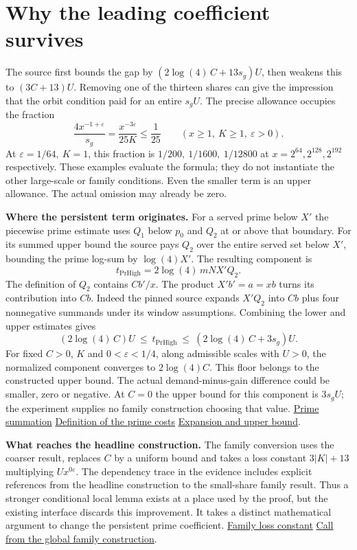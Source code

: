 \documentclass[12pt,letterpaper]{article}
\newcommand{\orig}[3]{\href{https://github.com/nousentllc/riemann-hypothesis/blob/40e56bab026552e089d7afcfeff08d2defb9c005/src/#1.lean\#L#2}{#3}}
\newcommand{\para}[1]{\par\medskip\noindent\textbf{#1}\quad}
\newcommand{\pagepart}[1]{\clearpage\section{#1}}
\newcommand{\sg}{s_g}\newcommand{\floorc}{2\log(4)\,C}
\begin{document}
\pagepart{Why the leading coefficient survives}
The source first bounds the gap by \((\floorc+13\sg)U\), then weakens this to \((3C+13)U\). Removing one of the thirteen shares can give the impression that the orbit condition paid for an entire \(\sg U\). The precise allowance occupies the fraction
\[
 \frac{4x^{-1+\varepsilon}}{\sg}
 =\frac{x^{-3\varepsilon}}{25K}\le\frac1{25}
 \qquad(x\ge1,\ K\ge1,\ \varepsilon>0).
\]
At \(\varepsilon=1/64,\ K=1\), this fraction is \(1/200,\ 1/1600,\ 1/12800\) at \(x=2^{64},2^{128},2^{192}\) respectively. These examples evaluate the formula; they do not instantiate the other large-scale or family conditions. Even the smaller term is an upper allowance. The actual omission may already be zero.

\para{Where the persistent term originates.} For a served prime below \(X'\) the piecewise prime estimate uses \(Q_1\) below \(p_0\) and \(Q_2\) at or above that boundary. For its summed upper bound the source pays \(Q_2\) over the entire served set below \(X'\), bounding the prime log-sum by \(\log(4)X'\). The resulting component is
\[
 t_{\mathrm{PrHigh}}=2\log(4)\,mN X' Q_2.
\]
The definition of \(Q_2\) contains \(C b'/x\). The product \(X'b'=a=xb\) turns its contribution into \(Cb\). Indeed the pinned source expands \(X'Q_2\) into \(Cb\) plus four nonnegative summands under its window assumptions. Combining the lower and upper estimates gives
\[
 (\floorc)U\ \le\ t_{\mathrm{PrHigh}}\ \le\ (\floorc+3\sg)U .
\]
For fixed \(C>0\), \(K\) and \(0<\varepsilon<1/4\), along admissible scales with \(U>0\), the normalized component converges to \(2\log(4)C\). This floor belongs to the constructed upper bound. The actual demand-minus-gain difference could be smaller, zero or negative. At \(C=0\) the upper bound for this component is \(3\sg U\); the experiment supplies no family construction choosing that value.
\orig{Formalism/SizeWindowBrackets/ChainSlopeWindows/AdmissibleSchurLemma}{530}{Prime summation}\quad
\orig{Formalism/SizeWindowBrackets/WindowSettingSatisfiable}{85}{Definition of the prime costs}\quad
\orig{Formalism/SizeWindowBrackets/ChainSlopeWindows/OneLeThresholdMulPowers}{444}{Expansion and upper bound}.

\para{What reaches the headline construction.} The family conversion uses the coarser result, replaces \(C\) by a uniform bound and takes a loss constant \(3|K|+13\) multiplying \(Ux^{0\varepsilon}\). The dependency trace in the evidence includes explicit references from the headline construction to the small-share family result. Thus a stronger conditional local lemma exists at a place used by the proof, but the existing interface discards this improvement. It takes a distinct mathematical argument to change the persistent prime coefficient.
\orig{Formalism/LocalToGlobal/GlobalTheory/LossRequirementsOfSmallShares}{86}{Family loss constant}\quad
\orig{Formalism/SharpRestriction/GlobalSchurBounds/LinkMin}{720}{Call from the global family construction}.
\end{document}
